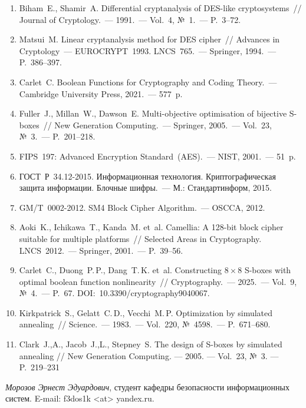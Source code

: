 \documentclass[10pt, a5paper]{extarticle}
\begin{document}
\begin{enumerate}
  \setlength{\itemsep}{0pt}
  \setlength{\parsep}{0pt}
  \item Biham~E., Shamir~A. Differential cryptanalysis of DES-like
    cryptosystems~// Journal of Cryptology.~--- 1991.~--- Vol.~4,
    №~1.~--- P.~3--72.
  \item Matsui~M. Linear cryptanalysis method for DES cipher~//
    Advances in Cryptology~--- EUROCRYPT~1993. LNCS~765.~---
    Springer, 1994.~--- P.~386--397.
  \item Carlet~C. Boolean Functions for Cryptography and Coding 
  Theory.~--- Cambridge University Press, 2021.~--- 577~p.
  \item Fuller~J., Millan~W., Dawson~E. Multi-objective optimisation 
  of bijective S-boxes~// New Generation Computing.~--- 
  Springer, 2005.~--- Vol.~23, №~3.~--- P.~201--218.
  \item FIPS~197: Advanced Encryption Standard~(AES).~--- NIST,
    2001.~--- 51~p.
  \item ГОСТ~Р~34.12-2015. Информационная технология.
    Криптографическая защита информации. Блочные шифры.~---
    М.: Стандартинформ, 2015.
  \item GM/T~0002-2012. SM4 Block Cipher Algorithm.~---
    OSCCA, 2012.
  \item Aoki~K., Ichikawa~T., Kanda~M. et~al.
    Camellia: A 128-bit block cipher suitable for multiple
    platforms~// Selected Areas in Cryptography. LNCS~2012.~---
    Springer, 2001.~--- P.~39--56.
  \item Carlet~C., Duong~P.\,P., Dang~T.\,K. et~al.
    Constructing $8\times8$ S-boxes with optimal boolean function
    nonlinearity~// Cryptography.~--- 2025.~--- Vol.~9, №~4.~---
    P.~67. DOI:~10.3390/cryptography9040067.
  \item Kirkpatrick~S., Gelatt~C.\,D., Vecchi~M.\,P. Optimization
    by simulated annealing~// Science.~--- 1983.~--- Vol.~220,
    №~4598.~--- P.~671--680.
    \item Clark~J.,A., Jacob~J.,L., Stepney~S. The design of S-boxes by simulated annealing // New Generation Computing. — 2005. — Vol.~23, №~3. — P.~219–231
\end{enumerate}

\noindent\textit{Морозов Эрнест Эдуардович}, студент кафедры
безопасности информационных систем. E-mail: f3dos1k <at> yandex.ru.
\end{document}
